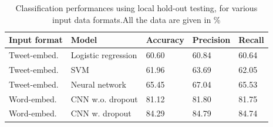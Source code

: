 \begin{table}[h]
  \centering
  \begin{tabular}[c]{lllll}
    Input format&Model&Accuracy&Precision&Recall\\
    \hline
    Tweet-embed.&Logistic regression & 60.60 &    60.84   & 60.64  \\
    Tweet-embed.&SVM             & 61.96    &   63.69     & 62.05   \\
    Tweet-embed.&Neural network & 65.45	& 67.04	& 65.53	 \\
    Word-embed.&CNN w.o. dropout &  81.12  & 81.80	& 81.75	 \\
    Word-embed.&CNN w. dropout & 84.29 & 84.79 & 84.74 
    
  \end{tabular}
  \caption{Classification performances using local hold-out testing, for various input data formats.All the data are given in \%}
  \label{tab:results}
\end{table}


